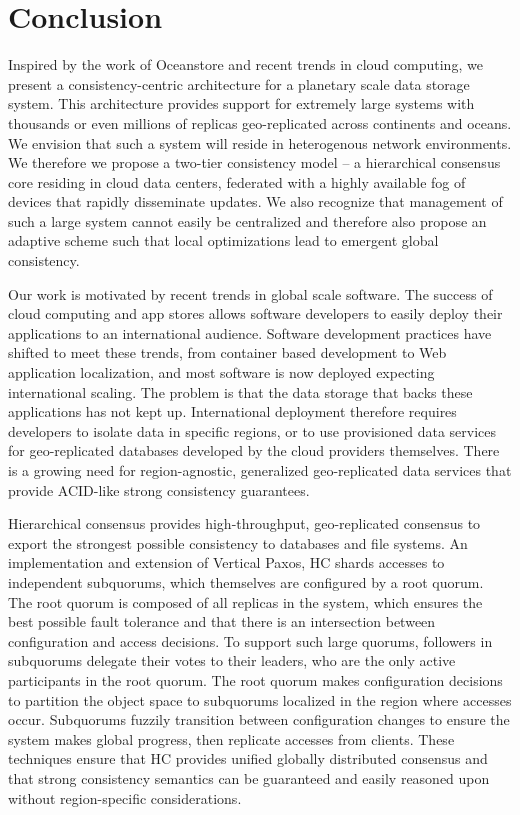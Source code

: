 
\renewcommand{\thechapter}{8}

\chapter{Conclusion}
\label{ch:conclusion}

Inspired by the work of Oceanstore and recent trends in cloud computing, we present a consistency-centric architecture for a planetary scale data storage system.
This architecture provides support for extremely large systems with thousands or even millions of replicas geo-replicated across continents and oceans.
We envision that such a system will reside in heterogenous network environments.
We therefore we propose a two-tier consistency model -- a hierarchical consensus core residing in cloud data centers, federated with a highly available fog of devices that rapidly disseminate updates.
We also recognize that management of such a large system cannot easily be centralized and therefore also propose an adaptive scheme such that local optimizations lead to emergent global consistency.

Our work is motivated by recent trends in global scale software.
The success of cloud computing and app stores allows software developers to easily deploy their applications to an international audience.
Software development practices have shifted to meet these trends, from container based development to Web application localization, and most software is now deployed expecting international scaling.
The problem is that the data storage that backs these applications has not kept up.
International deployment therefore requires developers to isolate data in specific regions, or to use provisioned data services for geo-replicated databases developed by the cloud providers themselves.
There is a growing need for region-agnostic, generalized geo-replicated data services that provide ACID-like strong consistency guarantees.

Hierarchical consensus provides high-throughput, geo-replicated consensus to export the strongest possible consistency to databases and file systems.
An implementation and extension of Vertical Paxos, HC shards accesses to independent subquorums, which themselves are configured by a root quorum.
The root quorum is composed of all replicas in the system, which ensures the best possible fault tolerance and that there is an intersection between configuration and access decisions.
To support such large quorums, followers in subquorums delegate their votes to their leaders, who are the only active participants in the root quorum.
The root quorum makes configuration decisions to partition the object space to subquorums localized in the region where accesses occur.
Subquorums fuzzily transition between configuration changes to ensure the system makes global progress, then replicate accesses from clients.
These techniques ensure that HC provides unified globally distributed consensus and that strong consistency semantics can be guaranteed and easily reasoned upon without region-specific considerations.

